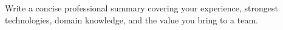 
\justifying
Write a concise professional summary covering your experience, strongest technologies, domain knowledge, and the value you bring to a team.
\par
